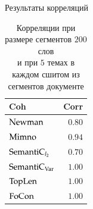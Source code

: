 \documentclass[sans, mathsans, russian]{beamer}
\begin{document}
\begin{frame}{Результаты корреляций}
  \begin{table}[t]
      \begin{tabular}{lr}
        Coh & Corr\\
        \midrule
        $\operatorname{Newman}$ & $0.80$\\
        $\operatorname{Mimno}$ & $0.94$\\
        $\operatorname{SemantiC}_{l_2}$ & $0.70$\\
        $\operatorname{SemantiC}_{\operatorname{Var}}$ & $\mathbf{1.00}$\\
        $\operatorname{TopLen}$ & $\mathbf{1.00}$\\
        $\operatorname{FoCon}$ & $\mathbf{1.00}$\\
      \end{tabular}
    \centering
    \captionsetup{justification=centering}
    \caption*{
      Корреляции при размере сегментов $200$ %
      слов\\и при $5$ темах в каждом сшитом из сегментов документе
    }
  \end{table}
\end{frame}
\end{document}
